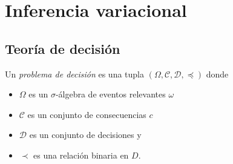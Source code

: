 \documentclass[main.tex]{subfiles}
\begin{document}
\chapter{Inferencia variacional}
%
%

\section{Teoría de decisión}
\begin{definition}
	Un \textit{problema de decisión} es una tupla $(\Omega, \mathcal{C}, \mathcal{D}, \preceq)$ donde
	\begin{itemize}
		\item $\Omega$ es un $\sigma$-álgebra de eventos relevantes $\omega$
		\item $\mathcal{C}$ es un conjunto de consecuencias $c$
		\item $\mathcal{D}$ es un conjunto de decisiones y 
		\item $\prec$ es una relación binaria en $D$.
	\end{itemize}
\end{definition}
	
\end{document}

